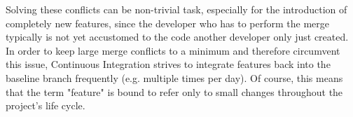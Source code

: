 Solving these conflicts can be non-trivial task, especially for the introduction
of completely new features, since the developer who has to perform the merge
typically is not yet accustomed to the code another developer only just
created.\\

In order to keep large merge conflicts to a minimum and therefore circumvent
this issue, Continuous Integration strives to integrate features back into the
baseline branch frequently (e.g. multiple times per day).  Of course, this means
that the term "feature" is bound to refer only to small changes throughout the
project's life cycle.
